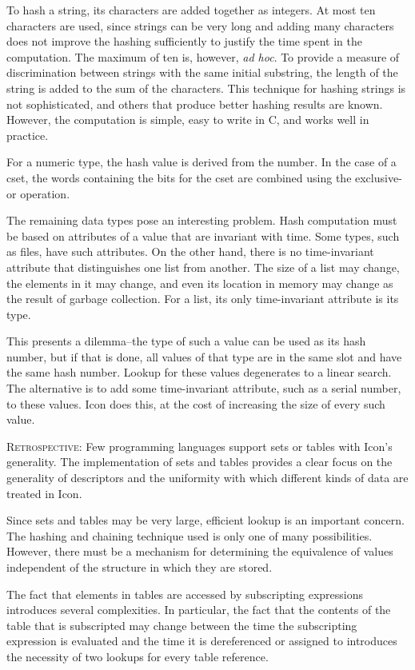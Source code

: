 To hash a string, its characters are added together as integers. At
most ten characters are used, since strings can be very long and
adding many characters does not improve the hashing sufficiently to
justify the time spent in the computation. The maximum of ten is,
however, \textit{ad hoc}. To provide a measure of discrimination
between strings with the same initial substring, the length of the
string is added to the sum of the characters. This technique for
hashing strings is not sophisticated, and others that produce better
hashing results are known. However, the computation is simple, easy to
write in C, and works well in practice.

For a numeric type, the hash value is derived from the number. In the
case of a cset, the words containing the bits for the cset are
combined using the exclusive-or operation.

The remaining data types pose an interesting problem. Hash computation
must be based on attributes of a value that are invariant with
time. Some types, such as files, have such attributes. On the other
hand, there is no time-invariant attribute that distinguishes one list
from another. The size of a list may change, the elements in it may
change, and even its location in memory may change as the result of
garbage collection. For a list, its only time-invariant attribute is
its type.

This presents a dilemma--the type of such a value can be used as its
hash number, but if that is done, all values of that type are in the
same slot and have the same hash number. Lookup for these values
degenerates to a linear search.  The alternative is to add some
time-invariant attribute, such as a serial number, to these
values. Icon does this, at the cost of increasing the size of every
such value.

\textsc{Retrospective}: Few programming languages support sets or
tables with Icon's generality. The implementation of sets and tables
provides a clear focus on the generality of descriptors and the
uniformity with which different kinds of data are treated in Icon.

Since sets and tables may be very large, efficient lookup is an
important concern. The hashing and chaining technique used is only one
of many possibilities. However, there must be a mechanism for
determining the equivalence of values independent of the structure in
which they are stored.

The fact that elements in tables are accessed by subscripting
expressions introduces several complexities. In particular, the fact
that the contents of the table that is subscripted may change between
the time the subscripting expression is evaluated and the time it is
dereferenced or assigned to introduces the necessity of two lookups
for every table reference.

